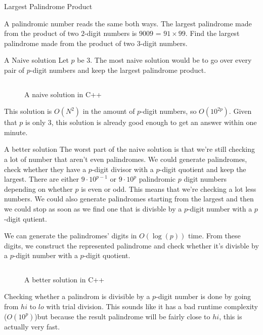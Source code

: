 \documentclass[main.tex]{subfiles}
\begin{document}
\begin{prob}{4}{Largest Palindrome Product}
  \begin{problem}
    A palindromic number reads the same both ways.
    The largest palindrome made from the product of two $2$-digit numbers is $9009$ = $91 \times 99$.
    Find the largest palindrome made from the product of two $3$-digit numbers.
  \end{problem}
  \begin{solutions}
    \begin{solution}{A Naive solution}
      Let $p$ be $3$.
      The most naive solution would be to go over every pair of $p$-digit numbers and keep the largest palindrome product.
      \begin{figure}[H]
        \inputminted[firstline=16, lastline=26]{c++}{\sol{004}{c++}/naive.cc}
        \caption{A naive solution in C++}
      \end{figure}
      This solution is $O(N^2)$ in the amount of $p$-digit numbers, so $O(10^{2p})$.
      Given that $p$ is only $3$, this solution is already good enough to get an answer within one minute.
    \end{solution}

    \begin{solution}{A better solution}
      The worst part of the naive solution is that we're still checking a lot of number that aren't even palindromes.
      We could generate palindromes, check whether they have a $p$-digit divisor with a $p$-digit quotient and keep the largest.
      There are either $9\cdot 10^{p-1}$ or $9 \cdot 10^{p}$ palindromic $p$ digit numbers depending on whether $p$ is even or odd. 
      This means that we're checking a lot less numbers.
      We could also generate palindromes starting from the largest and then we could stop as soon as we find one that is divisble by a $p$-digit number with a $p$-digit qutient.

      We can generate the palindromes' digits in $O(\log(p))$ time.
      From these digits, we construct the represented palindrome and check whether it's divisble by a $p$-digit number with a $p$-digit quotient.

      \begin{figure}[H]
        \inputminted[firstline=18, lastline=41]{c++}{\sol{004}{c++}/solution.cc}
        \caption{A better solution in C++}
      \end{figure}

      Checking whether a palindrom is divisible by a $p$-digit number is done by going from $hi$ to $lo$ with trial division.
      This sounds like it has a bad runtime complexity ($O(10^{p})$)but because the result palindrome will be fairly close to $hi$, this is actually very fast.
    \end{solution}
  \end{solutions}
\end{prob}
\end{document}
